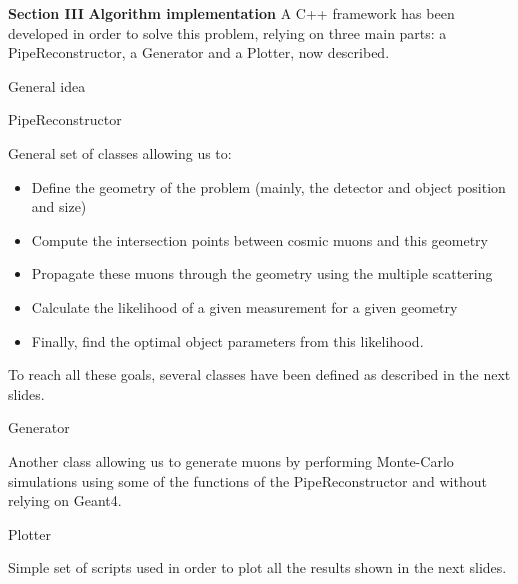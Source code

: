 \documentclass[8 pt]{beamer}
\begin{document}
\begin{frame}{}
\centering
	\huge{\textbf{\color{mycolor} Section III}} \newline
	\LARGE{\textbf{\color{mycolor} Algorithm implementation \color{black}}} \vfill
\Large{A C++ framework has been developed in order to solve this problem, relying on three main parts: a PipeReconstructor, a Generator and a Plotter, now described.} \vfill
\end{frame}

\begin{frame}{General idea}
\begin{exampleblock}{} PipeReconstructor \end{exampleblock}
General set of classes allowing us to:
\begin{itemize}
\justifying
\item Define the geometry of the problem (mainly, the detector and object position and size)
\item Compute the intersection points between cosmic muons and this geometry
\item Propagate these muons through the geometry using the multiple scattering
\item Calculate the likelihood of a given measurement for a given geometry
\item Finally, find the optimal object parameters from this likelihood.
\end{itemize}
To reach all these goals, several classes have been defined as described in the next slides. \vfill

\begin{exampleblock}{} Generator \end{exampleblock}
Another class allowing us to generate muons by performing Monte-Carlo simulations using some of the functions of the PipeReconstructor and without relying on Geant4. \vfill

\begin{exampleblock}{} Plotter \end{exampleblock}
Simple set of scripts used in order to plot all the results shown in the next slides. \vfill
\end{frame}
\end{document}
